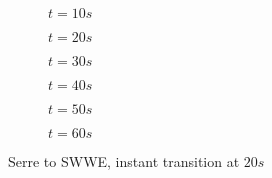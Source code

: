 \documentclass[10pt]{article}
\begin{document}
\begin{figure}
	\centering
	\begin{subfigure}{0.49\textwidth}
		\centering
		
		\caption{$t=10s$}
	\end{subfigure}
	\begin{subfigure}{0.49\textwidth}
		\centering
		
		\caption{$t=20s$}
	\end{subfigure}
	\begin{subfigure}{0.49\textwidth}
		\centering
		
		\caption{$t=30s$}
	\end{subfigure}
	\begin{subfigure}{0.49\textwidth}
		\centering
		
		\caption{$t=40s$}
	\end{subfigure}
	\begin{subfigure}{0.49\textwidth}
		\centering
		
		\caption{$t=50s$}
	\end{subfigure}
	\begin{subfigure}{0.49\textwidth}
		\centering
		
		\caption{$t=60s$}
	\end{subfigure}
	\caption{ Serre to SWWE, instant transition at $20s$}
\end{figure}
\end{document}
